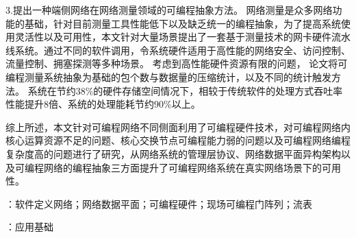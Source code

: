 3.提出一种端侧网络在网络测量领域的可编程抽象方法。
网络测量是众多网络功能的基础，针对目前测量工具性能低下以及缺乏统一的编程抽象，为了提高系统使用灵活性以及可用性，本文针对大量场景提出了一套基于测量技术的网卡硬件流水线系统。通过不同的软件调用，令系统硬件适用于高性能的网络安全、访问控制、流量控制、拥塞探测等多种场景。
考虑到高性能硬件资源有限的问题，
论文将可编程测量系统抽象为基础的包个数与数据量的压缩统计，以及不同的统计触发方法。
系统在节约38\%的硬件存储空间情况下，相较于传统软件的处理方式吞吐率性能提升8倍、系统的处理能耗节约90\%以上。

综上所述，本文针对可编程网络不同侧面利用了可编程硬件技术，对可编程网络内核心运算资源不足的问题、核心交换节点可编程能力弱的问题以及可编程网络编程复杂度高的问题进行了研究，从网络系统的管理层协议、网络数据平面异构架构以及可编程网络的编程抽象三方面提升了可编程网络系统在真实网络场景下的可用性。



{\boldsong}
\vspace{\baselineskip}
：软件定义网络；网络数据平面；可编程硬件；现场可编程门阵列；流表

\vspace{\baselineskip}
：应用基础


\clearpage


